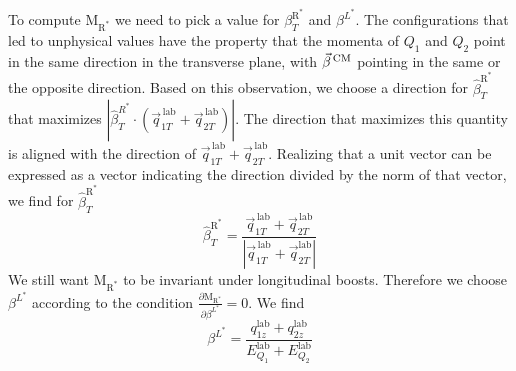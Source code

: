 To compute $\mathrm{M_{R^*}}$ we need to pick a value for $\beta_T^{\mathrm{R}^*}$ and
$\beta^{L^*}$. The configurations that led to unphysical \mr values have the property that the
momenta of $Q_1$ and $Q_2$ point in the same direction in the transverse plane, with $\vec{\beta}^{\,\textrm{CM}}$
pointing in the same or the opposite direction. Based on this observation, we choose a direction
for $\hat{\beta}_T^{\mathrm{R}^*}$ that maximizes $|\hat{\beta}_T^{R^*} \cdot
(\vec{q}_{1T}^{\,\textrm{lab}} + \vec{q}_{2T}^{\,\textrm{lab}})|$. The direction that maximizes this
quantity is aligned with the direction of $\vec{q}_{1T}^{\,\textrm{lab}} +
\vec{q}_{2T}^{\,\textrm{lab}}$. Realizing that a unit vector can be expressed as a vector indicating
the direction divided by the norm of that vector, we find for $\hat{\beta}_T^{\mathrm{R}^*}$ 
\begin{equation}
  \hat{\beta}_T^{\mathrm{R}^*} = \frac{\vec{q}_{1T}^{\,\textrm{lab}} +
\vec{q}_{2T}^{\,\textrm{lab}}}{|\vec{q}_{1T}^{\,\textrm{lab}} + \vec{q}_{2T}^{\textrm{lab}}|}
\label{eq:razor_beta_T_Rstar}
\end{equation}
We still want $\mathrm{M_{R^*}}$ to be invariant under longitudinal boosts. Therefore we choose
$\beta^{L^*}$ according to the condition $\frac{\partial \mathrm{M_{R^*}}}{\partial \beta^{L^*}} =
0$.
We find
\begin{equation}
  \beta^{L^*} = \frac{q_{1z}^{\textrm{lab}} + q_{2z}^{\textrm{lab}}}
{E_{Q_1}^{\textrm{lab}} + E_{Q_2}^{\textrm{lab}}}
\label{eq:razor_beta_Lstar}
\end{equation}

